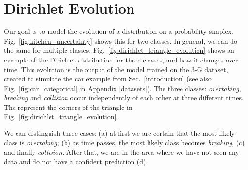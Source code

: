 \section{Dirichlet Evolution}
\label{dirichlet_triangle_evolution}

Our goal is to model the evolution of a distribution on a probability simplex. Fig.\ \ref{fig:kitchen_uncertainty} shows this for two classes. In general, we can do the same for multiple classes. Fig.\ \ref{fig:dirichlet_triangle_evolution} shows an example of the  Dirichlet distribution for three classes, and how it changes over time. This evolution is the output of the \DirModel model trained on the 3-G dataset, created to simulate the car example from Sec.\ \ref{introduction} (see also Fig.\ \ref{fig:car_categorical} in Appendix \ref{datasets}). The three classes: \textit{overtaking}, \textit{breaking} and \textit{collision} occur independently of each other at three different times. The represent the corners of the triangle in Fig.~\ref{fig:dirichlet_triangle_evolution}.

We can distinguish three cases: (a) at first we are certain that the most likely class is \textit{overtaking}; (b) as time passes, the most likely class becomes \textit{breaking}, (c) and finally \textit{collision}. After that, we are in the area where we have not seen any data and do not have a confident prediction (d).

